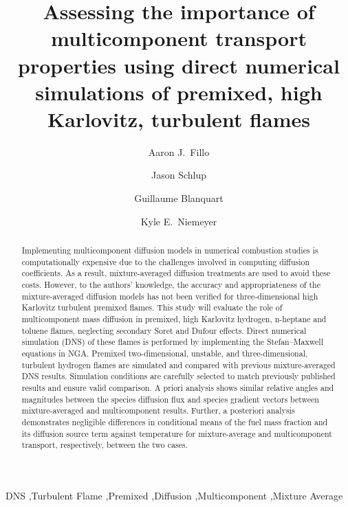 \documentclass[preprint,review,12pt]{elsarticle}
\begin{document}
\begin{frontmatter}

\title{Assessing the importance of multicomponent transport properties using direct numerical simulations of premixed, high Karlovitz, turbulent flames}

\author[1]{Aaron J.~Fillo}

\author[2]{Jason Schlup}
\author[3]{Guillaume Blanquart}
\author[1]{Kyle E.~Niemeyer}

\address[1]{School of Mechanical, Industrial, and Manufacturing Engineering, Oregon State University, Corvallis, OR 97331, USA}
\address[2]{Graduate Aerospace Laboratories, California Institute of Technology, Pasadena, USA}
\address[3]{Mechanical Engineering, California Institute of Technology, Pasadena, USA}


\begin{abstract}
Implementing multicomponent diffusion models in numerical combustion studies is computationally expensive due to the challenges involved in computing diffusion coefficients.
As a result, mixture-averaged diffusion treatments are used to avoid these costs.
However, to the authors' knowledge, the accuracy and appropriateness of the mixture-averaged diffusion models has not been verified for three-dimensional high Karlovitz turbulent premixed flames.
This study will evaluate the role of multicomponent mass diffusion in premixed, high Karlovitz hydrogen, n-heptane and toluene flames, neglecting secondary Soret and Dufour effects.
Direct numerical simulation (DNS) of these flames is performed by implementing the Stefan--Maxwell equations in NGA.
Premixed two-dimensional, unstable, and three-dimensional, turbulent hydrogen flames are simulated and compared with previous mixture-averaged DNS results.
Simulation conditions are carefully selected to match previously published results and ensure valid comparison.
A priori analysis shows similar relative angles and magnitudes between the species diffusion flux and species gradient vectors between mixture-averaged and multicomponent results.
Further, a posteriori analysis demonstrates negligible differences in conditional means of the fuel mass fraction and its diffusion source term against temperature for mixture-average and multicomponent transport, respectively, between the two cases.
\end{abstract}

\begin{keyword}
DNS \sep Turbulent Flame \sep Premixed \sep Diffusion \sep Multicomponent \sep Mixture Average
\end{keyword}

\end{frontmatter}
\end{document}
